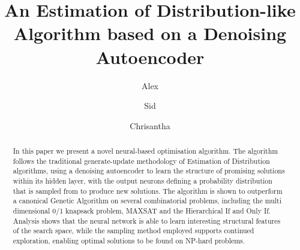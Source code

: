 \documentclass[runningheads,a4paper]{llncs}
\begin{document}
\mainmatter  %

\title{An Estimation of Distribution-like Algorithm based on a Denoising Autoencoder}


%
%
\author{Alex%
%
\and Sid\and Chrisantha}
%


%
%

\maketitle


\begin{abstract}
In this paper we present a novel neural-based optimisation algorithm. The algorithm follows the traditional generate-update methodology of Estimation of Distribution algorithms, using a denoising autoencoder to learn the structure of promising solutions within its hidden layer, with the output neurons defining a probability distribution that is sampled from to produce new solutions. The algorithm is shown to outperform a canonical Genetic Algorithm on several combinatorial problems, including the multi dimensional 0/1 knapsack problem, MAXSAT and the Hierarchical If and Only If. Analysis shows that the neural network is able to learn interesting structural features of the search space, while the sampling method employed supports continued exploration, enabling optimal solutions to be found on NP-hard problems.
\end{abstract}
\end{document}
